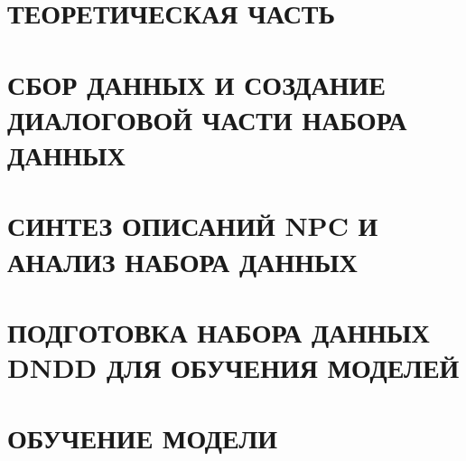 \documentclass{thesis}
\begin{document}

\tableofcontents                          %
\thispagestyle{empty}


\chapter{ТЕОРЕТИЧЕСКАЯ ЧАСТЬ}


\chapter{СБОР ДАННЫХ И СОЗДАНИЕ ДИАЛОГОВОЙ ЧАСТИ НАБОРА ДАННЫХ}


\chapter{СИНТЕЗ ОПИСАНИЙ NPC И АНАЛИЗ НАБОРА ДАННЫХ}


\chapter{ПОДГОТОВКА НАБОРА ДАННЫХ DNDD ДЛЯ ОБУЧЕНИЯ МОДЕЛЕЙ}


\chapter{ОБУЧЕНИЕ МОДЕЛИ}



\break



\appendix

\end{document}
